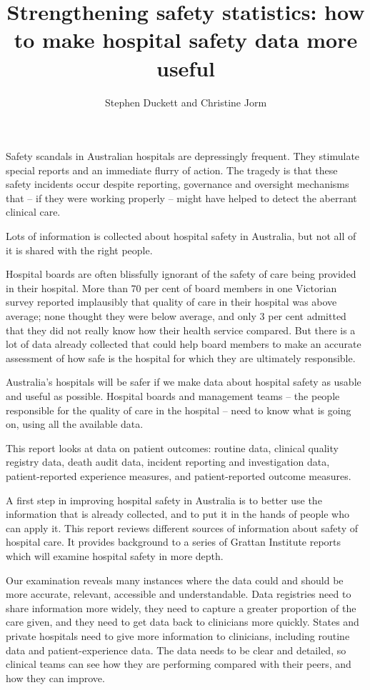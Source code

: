 \documentclass[FrontPage]{grattan}
\author{Stephen Duckett and Christine Jorm}
\title{Strengthening safety statistics: how to make hospital safety data more useful}
\begin{document}
\begin{overview}
Safety scandals in Australian hospitals are depressingly frequent.
They stimulate special reports and an immediate flurry of action. The tragedy is that these safety incidents occur despite reporting, governance and oversight mechanisms that -- if they were working properly -- might have helped to detect the aberrant clinical care.

Lots of information is collected about hospital safety in Australia, but not all of it is shared with the right people. 

Hospital boards are often blissfully ignorant of the safety of care being provided in their hospital. More than 70 per cent of board members in one Victorian survey reported implausibly that quality of care in their hospital was above average; none thought they were below average, and only 3 per cent admitted that they did not really know how their health service compared. But there is a lot of data already collected that could help board members to make an accurate assessment of how safe is the hospital for which they are ultimately responsible.


Australia’s hospitals will be safer if we make data about hospital safety as usable and useful as possible. Hospital boards and management teams – the people responsible for the quality of care in the hospital – need to know what is going on, using all the available data.

This report looks at data on patient outcomes: routine data, clinical quality registry data, death audit data, incident reporting and investigation data, patient-reported experience measures, and patient-reported outcome measures. 

A first step in improving hospital safety in Australia is to better use the information that is already collected, and to put it in the hands of people who can apply it. This report reviews different sources of information about safety of hospital care. It provides background to a series of Grattan Institute reports which will examine hospital safety in more depth.

Our examination reveals many instances where the data could and should be more accurate, relevant, accessible and understandable. Data registries need to share information more widely, they need to capture a greater proportion of the care given, and they need to get data back to clinicians more quickly. States and private hospitals need to give more information to clinicians, including routine data and patient-experience data. The data needs to be clear and detailed, so clinical teams can see how they are performing compared with their peers, and how they can improve. 


\end{overview}
\end{document}
